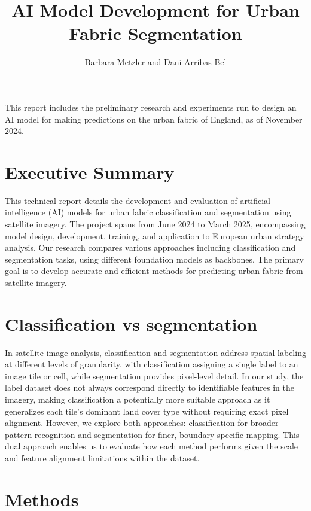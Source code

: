 \documentclass[
  letterpaper,
  DIV=11,
  numbers=noendperiod]{scrartcl}
\title{AI Model Development for Urban Fabric Segmentation}
\author{Barbara Metzler and Dani Arribas-Bel}
\date{}
\renewcommand*\contentsname{Table of contents}
\newcommand\contentsname{Table of contents}
\begin{document}
\maketitle

\renewcommand*\contentsname{Table of contents}
{
\hypersetup{linkcolor=}
\setcounter{tocdepth}{3}
\tableofcontents
}
This report includes the preliminary research and experiments run to
design an AI model for making predictions on the urban fabric of
England, as of November 2024.

\section{Executive Summary}\label{executive-summary}

This technical report details the development and evaluation of
artificial intelligence (AI) models for urban fabric classification and
segmentation using satellite imagery. The project spans from June 2024
to March 2025, encompassing model design, development, training, and
application to European urban strategy analysis. Our research compares
various approaches including classification and segmentation tasks,
using different foundation models as backbones. The primary goal is to
develop accurate and efficient methods for predicting urban fabric from
satellite imagery.

\section{Classification vs
segmentation}\label{classification-vs-segmentation}

In satellite image analysis, classification and segmentation address
spatial labeling at different levels of granularity, with classification
assigning a single label to an image tile or cell, while segmentation
provides pixel-level detail. In our study, the label dataset does not
always correspond directly to identifiable features in the imagery,
making classification a potentially more suitable approach as it
generalizes each tile's dominant land cover type without requiring exact
pixel alignment. However, we explore both approaches: classification for
broader pattern recognition and segmentation for finer,
boundary-specific mapping. This dual approach enables us to evaluate how
each method performs given the scale and feature alignment limitations
within the dataset.

\section{Methods}\label{methods}
\end{document}
